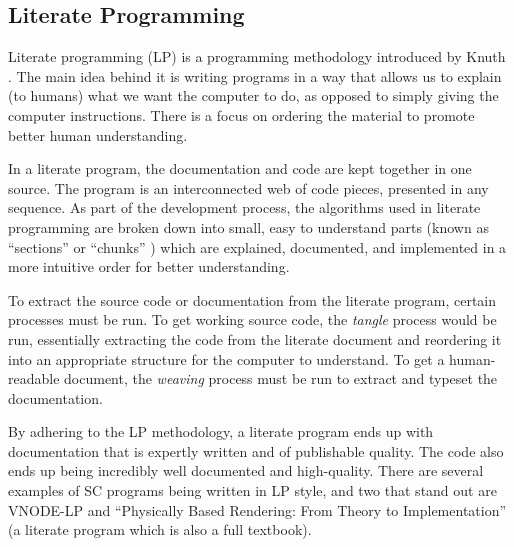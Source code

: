 \documentclass{sig-alternate-05-2015}
\begin{document}

\subsection{Literate Programming} \label{ssec:literate}

Literate programming (LP) is a programming methodology introduced by Knuth
\cite{Knuth1984}. The main idea behind it is writing programs in a way that
allows us to explain (to humans) what we want the computer to do, as opposed to
simply giving the computer instructions. There is a focus on ordering the
material to promote better human understanding.

In a literate program, the documentation and code are kept together in one
source. The program is an interconnected web of code pieces, presented in any
sequence. As part of the development process, the algorithms used in literate
programming are broken down into small, easy to understand parts (known as
``sections'' \cite{Knuth1984} or ``chunks'' \cite{JohnsonAndJohnson1997}) which are
explained, documented, and implemented in a more intuitive order for better
understanding.

To extract the source code or documentation from the literate program, certain
processes must be run. To get working source code, the \textit{tangle} process
would be run, essentially extracting the code from the literate document and
reordering it into an appropriate structure for the computer to understand.  To
get a human-readable document, the \textit{weaving} process must be run to
extract and typeset the documentation.

By adhering to the LP methodology, a literate program ends up with documentation
that is expertly written and of publishable quality. The code also ends up being
incredibly well documented and high-quality. There are several examples of SC
programs being written in LP style, and two that stand out are VNODE-LP
\cite{Nedialkov2006} and ``Physically Based Rendering: From Theory to
Implementation'' \cite{PharrAndHumphreys2004} (a literate program which is also
a full textbook).
\end{document}

